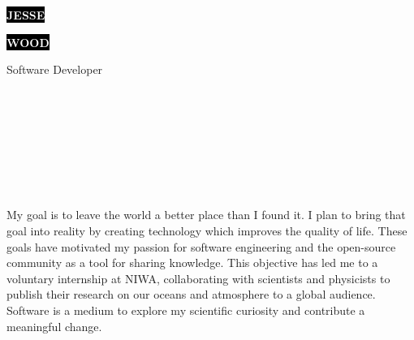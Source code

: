 \documentclass[9pt]{developercv}
\begin{document}

\begin{minipage}[t]{0.45\textwidth}
	\vspace{-\baselineskip}
	\colorbox{black}{{\HUGE\textcolor{white}{\textbf{\MakeUppercase{Jesse}}}}} %

	\colorbox{black}{{\HUGE\textcolor{white}{\textbf{\MakeUppercase{Wood}}}}} %

	\vspace{6pt}

	{\huge Software Developer}
\end{minipage}
\begin{minipage}[t]{0.275\textwidth}
	\vspace{-\baselineskip}
	\\
	\\
	\\
\end{minipage}
\begin{minipage}[t]{0.275\textwidth}
	\vspace{-\baselineskip}
	\\
	\\
	\\
\end{minipage}

\vspace{0.5cm}


My goal is to leave the world a better place than I found it. I plan to bring that goal into reality by creating technology which improves the quality of life. These goals have motivated my passion for software engineering and the open-source community as a tool for sharing knowledge. This objective has led me to a voluntary internship at NIWA, collaborating with scientists and physicists to publish their research on our oceans and atmosphere to a global audience. Software is a medium to explore my scientific curiosity and contribute a meaningful change.
\end{document}
